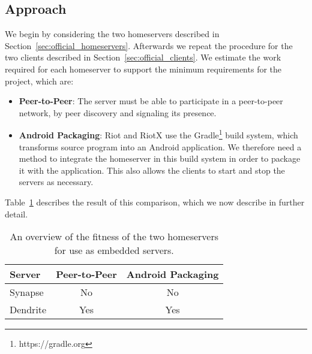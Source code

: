 \subsection{Approach}
We begin by considering the two homeservers described in Section~\ref{sec:official_homeservers}.
Afterwards we repeat the procedure for the two clients described in Section~\ref{sec:official_clients}.
We estimate the work required for each homeserver to support the minimum requirements for the project, which are:
\begin{itemize}
	\item{
	      \textbf{Peer-to-Peer}:
	      The server must be able to participate in a peer-to-peer network, by peer discovery and signaling its presence.
	      }
	\item{
	      \textbf{Android Packaging}:
	      Riot and RiotX use the Gradle\footnote{https://gradle.org} build system, which transforms source program into an Android application.
	      We therefore need a method to integrate the homeserver in this build system in order to package it with the application.
	      This also allows the clients to start and stop the servers as necessary.
	      }
\end{itemize}

Table~\ref{tab:homeserver_comparison} describes the result of this comparison, which we now describe in further detail.

\begin{table}[t]
	\center{}
	\begin{tabular}{lcc}
		\textbf{Server} & \multicolumn{1}{l}{\textbf{Peer-to-Peer}} & \multicolumn{1}{l}{\textbf{Android Packaging}} \\ \toprule
		Synapse         & No                                        & No                                             \\
		Dendrite        & Yes                                       & Yes
	\end{tabular}
	\caption{An overview of the fitness of the two homeservers for use as embedded servers.}\label{tab:homeserver_comparison}
\end{table}


